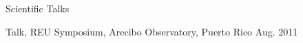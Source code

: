 \documentclass{resume_clark} %
\begin{document}
\begin{rSection}{Scientific Talks}
\begin{etaremune}[itemsep=-1.8mm]
\item Talk, REU Symposium, Arecibo Observatory, Puerto Rico \hfill {Aug. 2011}

\end{etaremune}



\end{rSection}





\end{document}
